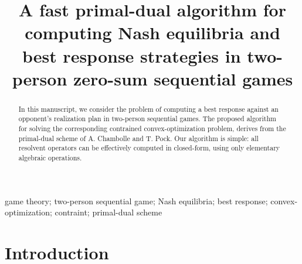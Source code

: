 \documentclass[a4paper,9pt,journal]{IEEEtran}
\begin{document}
\onecolumn
\title{A fast primal-dual algorithm for computing Nash equilibria and best response strategies in two-person zero-sum sequential games}


\author{}


\maketitle

\begin{abstract}
% 
In this manuscript, we consider the problem of computing a best response against an opponent's realization plan in two-person sequential games.
The proposed algorithm for solving the corresponding contrained convex-optimization problem, derives from the primal-dual scheme of A. Chambolle and T. Pock.
Our algorithm is simple: all resolvent operators can be effectively computed in closed-form, using only elementary algebraic operations.
\end{abstract}


\begin{IEEEkeywords}
  game theory; two-person sequential game; Nash equilibria; best response; convex-optimization; contraint; primal-dual scheme
\end{IEEEkeywords}

\section{Introduction}
\end{document}
